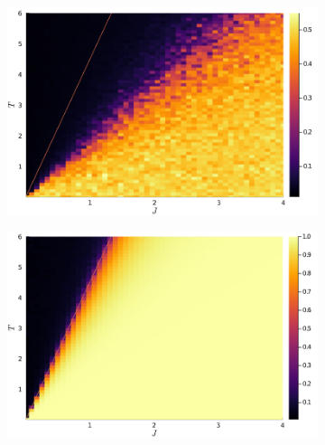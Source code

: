 \documentclass[hyperref, a4paper]{article}
\begin{document}
\begin{figure}
    \centering
    \begin{subfigure}{0.45\textwidth}
        \includegraphics[width=\textwidth]{../3d-ising-prototype/examples/isotropic/magnetization-metropolis-random-init.PNG}
    \end{subfigure}
    \begin{subfigure}{0.45\textwidth}
        \includegraphics[width=\textwidth]{../3d-ising-prototype/examples/isotropic/magnetization-metropolis-ones-init.PNG}
    \end{subfigure}
    \begin{subfigure}{0.45\textwidth}

\end{subfigure}
\end{figure}
\end{document}
